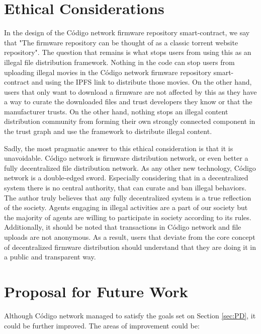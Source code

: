 {{}
\section{Ethical Considerations}{

In the design of the Código network firmware repository smart-contract, we say that "The firmware repository can be thought of as a classic torrent website repository". The question that remains is what stops users from using this as an illegal file distribution framework. Nothing in the code can stop users from uploading illegal movies in the Código network firmware repository smart-contract and using the IPFS link to distribute those movies. On the other hand, users that only want to download a firmware are not affected by this as they have a way to curate the downloaded files and trust developers they know or that the manufacturer trusts. On the other hand, nothing stops an illegal content distribution community from forming their own strongly connected component in the trust graph and use the framework to distribute illegal content.

Sadly, the most pragmatic answer to this ethical consideration is that it is unavoidable. Código network is firmware distribution network, or even better a fully decentralized file distribution network. As any other new technology, Código network is a double-edged sword. Especially considering that in a decentralized system there is no central authority, that can curate and ban illegal behaviors.  The author truly believes that any fully decentralized system is a true reflection of the society. Agents engaging in illegal activities are a part of our society but the majority of agents are willing to participate in society according to its rules. Additionally, it should be noted that transactions in Código network and file uploads are not anonymous. As a result, users that deviate from the core concept of decentralized firmware distribution should understand that they are doing it in a public and transparent way.


}
\section{Proposal for Future Work}{

Although Código network managed to satisfy the goals set on Section \ref{sec:PD}, it could be further improved. The areas of improvement could be:

}}
